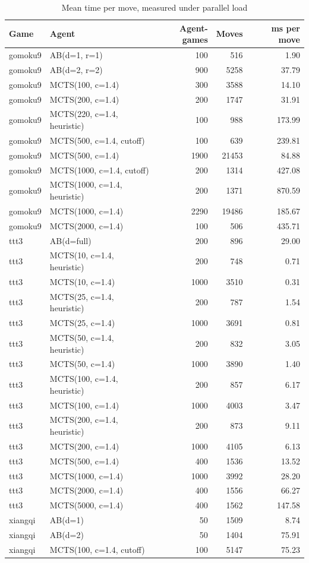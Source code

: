\begin{table}[!t]
\centering
\caption{Mean time per move, measured under parallel load}
\label{tab:timing}
\small
\begin{tabular}{llrrr}
\toprule
Game & Agent & Agent-games & Moves & ms per move \\
\midrule
gomoku9 & AB(d=1, r=1) & 100 & 516 & 1.90 \\
gomoku9 & AB(d=2, r=2) & 900 & 5258 & 37.79 \\
gomoku9 & MCTS(100, c=1.4) & 300 & 3588 & 14.10 \\
gomoku9 & MCTS(200, c=1.4) & 200 & 1747 & 31.91 \\
gomoku9 & MCTS(220, c=1.4, heuristic) & 100 & 988 & 173.99 \\
gomoku9 & MCTS(500, c=1.4, cutoff) & 100 & 639 & 239.81 \\
gomoku9 & MCTS(500, c=1.4) & 1900 & 21453 & 84.88 \\
gomoku9 & MCTS(1000, c=1.4, cutoff) & 200 & 1314 & 427.08 \\
gomoku9 & MCTS(1000, c=1.4, heuristic) & 200 & 1371 & 870.59 \\
gomoku9 & MCTS(1000, c=1.4) & 2290 & 19486 & 185.67 \\
gomoku9 & MCTS(2000, c=1.4) & 100 & 506 & 435.71 \\
ttt3 & AB(d=full) & 200 & 896 & 29.00 \\
ttt3 & MCTS(10, c=1.4, heuristic) & 200 & 748 & 0.71 \\
ttt3 & MCTS(10, c=1.4) & 1000 & 3510 & 0.31 \\
ttt3 & MCTS(25, c=1.4, heuristic) & 200 & 787 & 1.54 \\
ttt3 & MCTS(25, c=1.4) & 1000 & 3691 & 0.81 \\
ttt3 & MCTS(50, c=1.4, heuristic) & 200 & 832 & 3.05 \\
ttt3 & MCTS(50, c=1.4) & 1000 & 3890 & 1.40 \\
ttt3 & MCTS(100, c=1.4, heuristic) & 200 & 857 & 6.17 \\
ttt3 & MCTS(100, c=1.4) & 1000 & 4003 & 3.47 \\
ttt3 & MCTS(200, c=1.4, heuristic) & 200 & 873 & 9.11 \\
ttt3 & MCTS(200, c=1.4) & 1000 & 4105 & 6.13 \\
ttt3 & MCTS(500, c=1.4) & 400 & 1536 & 13.52 \\
ttt3 & MCTS(1000, c=1.4) & 1000 & 3992 & 28.20 \\
ttt3 & MCTS(2000, c=1.4) & 400 & 1556 & 66.27 \\
ttt3 & MCTS(5000, c=1.4) & 400 & 1562 & 147.58 \\
xiangqi & AB(d=1) & 50 & 1509 & 8.74 \\
xiangqi & AB(d=2) & 50 & 1404 & 75.91 \\
xiangqi & MCTS(100, c=1.4, cutoff) & 100 & 5147 & 75.23 \\
\bottomrule
\end{tabular}
\end{table}
